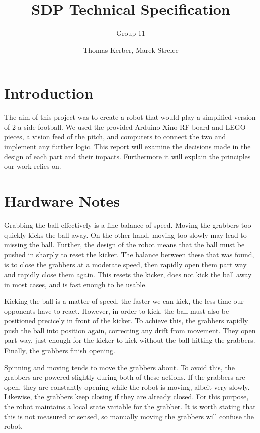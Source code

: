 \documentclass[a4paper,12pt]{scrartcl}
\author{Thomas Kerber, Marek Strelec}
\title{SDP Technical Specification}
\subtitle{Group 11}
\begin{document}
\maketitle

\section{Introduction}

The aim of this project was to create a robot that would play a simplified
version of 2-a-side football. We used the provided Arduino Xino RF board and
LEGO pieces, a vision feed of the pitch, and computers to connect the two and
implement any further logic. This report will examine the decisions made in the
design of each part and their impacts. Furthermore it will explain the
principles our work relies on.





\section{Hardware Notes}

Grabbing the ball effectively is a fine balance of speed. Moving the grabbers
too quickly kicks the ball away. On the other hand, moving too slowly may lead
to missing the ball. Further, the design of the robot means that the ball must
be pushed in sharply to reset the kicker. The balance between these that was
found, is to close the grabbers at a moderate speed, then rapidly open them
part way and rapidly close them again. This resets the kicker, does not kick the ball away in most cases, and is fast enough to be usable.

Kicking the ball is a matter of speed, the faster we can kick, the less time
our opponents have to react. However, in order to kick, the ball must also be
positioned precicely in front of the kicker. To achieve this, the grabbers
rapidly push the ball into position again, correcting any drift from movement.
They open part-way, just enough for the kicker to kick without the ball
hitting the grabbers. Finally, the grabbers finish opening.

Spinning and moving tends to move the grabbers about. To avoid this, the
grabbers are powered slightly during both of these actions. If the grabbers are
open, they are constantly opening while the robot is moving, albeit very
slowly. Likewise, the grabbers keep closing if they are already closed. For
this purpose, the robot maintains a local state variable for the grabber. It is
worth stating that this is not measured or sensed, so manually moving the
grabbers will confuse the robot.
\end{document}
